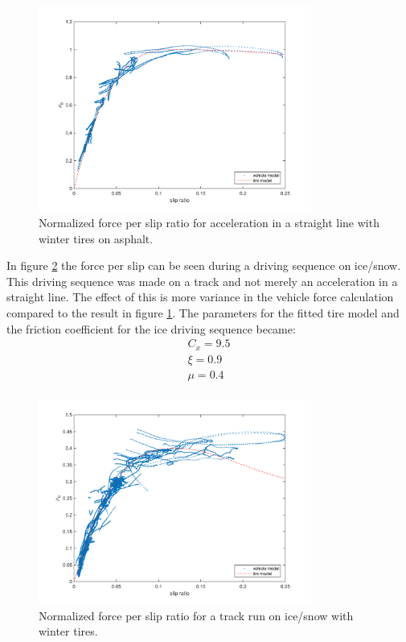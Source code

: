 \begin{figure}[h]
	\centering
	\includegraphics[width=0.8\textwidth]{Pictures/slip_kraft_ljungby}
	\caption {Normalized force per slip ratio for acceleration in a straight line with winter tires on asphalt.}
	\label{slip_kraft_ljungby}
\end{figure}

In figure \ref{slip_kraft_is} the force per slip can be seen during a driving sequence on ice/snow. This driving sequence was made on a track and not merely an acceleration in a straight line. The effect of this is more variance in the vehicle force calculation compared to the result in figure \ref{slip_kraft_ljungby}. The parameters for the fitted tire model and the friction coefficient for the ice driving sequence became:
\begin{equation}
\label{winter_ice}
\begin{split}
	C_{x} = 9.5 \\
	\xi = 0.9 \\
	\mu = 0.4 \\
\end{split}
\end{equation}

\begin{figure}[h]
	\centering
	\includegraphics[width=0.8\textwidth]{Pictures/slip_kraft_is}
	\caption {Normalized force per slip ratio for a track run on ice/snow with winter tires.}
	\label{slip_kraft_is}
\end{figure}

